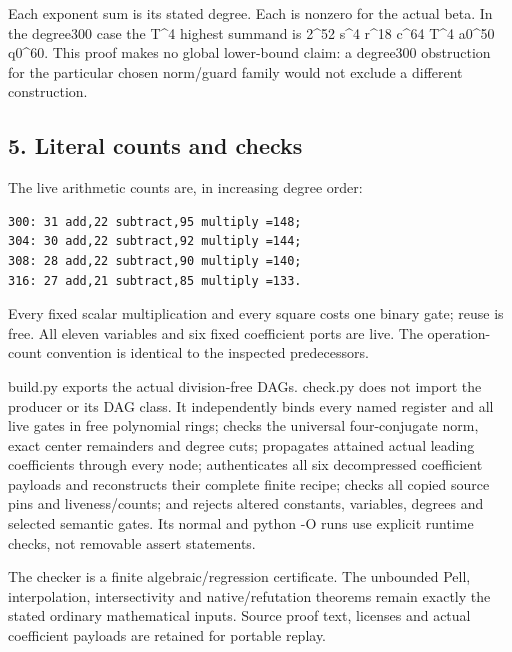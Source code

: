 Each exponent sum is its stated degree. Each is nonzero for the actual
beta. In the degree300 case the T\textasciicircum{}4 highest summand is
2\textasciicircum{}52 s\textasciicircum{}4 r\textasciicircum{}18 c\textasciicircum{}64 T\textasciicircum{}4 a0\textasciicircum{}50 q0\textasciicircum{}60. This proof makes no global lower-bound
claim: a degree300 obstruction for the particular chosen norm/guard family
would not exclude a different construction.

\subsection{5. Literal counts and checks}

The live arithmetic counts are, in increasing degree order:

\begingroup\small
\begin{verbatim}
300: 31 add,22 subtract,95 multiply =148;
304: 30 add,22 subtract,92 multiply =144;
308: 28 add,22 subtract,90 multiply =140;
316: 27 add,21 subtract,85 multiply =133.
\end{verbatim}
\endgroup

Every fixed scalar multiplication and every square costs one binary gate;
reuse is free. All eleven variables and six fixed coefficient ports are live.
The operation-count convention is identical to the inspected predecessors.

build.py exports the actual division-free DAGs. check.py does not import the
producer or its DAG class. It independently binds every named register and
all live gates in free polynomial rings; checks the universal four-conjugate
norm, exact center remainders and degree cuts; propagates attained actual
leading coefficients through every node; authenticates all six decompressed
coefficient payloads and reconstructs their complete finite recipe; checks
all copied source pins and liveness/counts; and rejects altered constants,
variables, degrees and selected semantic gates. Its normal and python -O
runs use explicit runtime checks, not removable assert statements.

The checker is a finite algebraic/regression certificate. The unbounded Pell,
interpolation, intersectivity and native/refutation theorems remain exactly
the stated ordinary mathematical inputs. Source proof text, licenses and
actual coefficient payloads are retained for portable replay.
